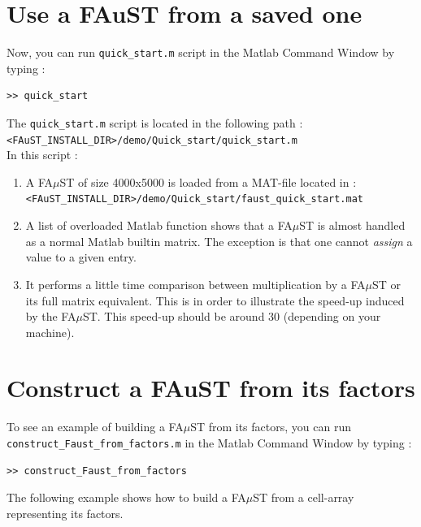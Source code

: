 \section{Use a FAuST from a saved one}\label{sec:firstUseBuildFromSave}
Now, you can run \texttt{quick\_start.m} script in the Matlab Command Window by typing :
\lstset{style=customMatlab}
\begin{lstlisting}
>> quick_start
\end{lstlisting}
The \texttt{quick\_start.m} script is located in the following path :\\
\texttt{<FAuST\_INSTALL\_DIR>/demo/Quick\_start/quick\_start.m} \\
In this script :
\begin{enumerate} 
	\item A FA$\mu$ST of size 4000x5000 is loaded from a MAT-file located in :\\
	\texttt{<FAuST\_INSTALL\_DIR>/demo/Quick\_start/faust\_quick\_start.mat}
	
	
	\item  A list of overloaded Matlab function shows that a FA$\mu$ST is almost handled as a normal Matlab builtin matrix. The exception is that one cannot \emph{assign} a value to a given entry.
 	

	\item It performs a little time comparison between multiplication by a FA$\mu$ST or its full matrix equivalent.
This is in order to illustrate the speed-up induced by the FA$\mu$ST. This speed-up should be around 30 (depending on your machine).
	
\end{enumerate}


\section{Construct a FAuST from its factors}\label{sec:firstUseBuildFactors}
To see an example of building a FA$\mu$ST from its factors, you can run \texttt{construct\_Faust\_from\_factors.m} in the Matlab Command Window by typing :
\lstset{style=customMatlab}
\begin{lstlisting}
>> construct_Faust_from_factors
\end{lstlisting}
The following example shows how to build a FA$\mu$ST from a cell-array representing its factors.


